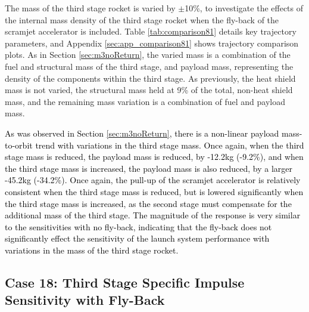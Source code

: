 \noindent
The mass of the third stage rocket is varied by $\pm$10\%, to investigate the effects of the internal mass density of the third stage rocket when the fly-back of the scramjet accelerator is included. Table \ref{tab:comparison81} details key trajectory parameters, and Appendix \ref{sec:app_comparison81} shows trajectory comparison plots. As in Section \ref{sec:m3noReturn}, the varied mass is a combination of the fuel and structural mass of the third stage, and payload mass, representing the density of the components within the third stage. As previously, the heat shield mass is not varied, the structural mass held at 9\% of the total, non-heat shield mass, and the remaining mass variation is a combination of fuel and payload mass.

\textcolor{black}{
As was observed in Section \ref{sec:m3noReturn}, there is a non-linear payload mass-to-orbit trend with variations in the third stage mass. Once again, when the third stage mass is reduced, the payload mass is reduced, by -12.2kg (-9.2\%), and when the third stage mass is increased, the payload mass is also reduced, by a larger -45.2kg (-34.2\%). Once again, the pull-up of the scramjet accelerator is relatively consistent when the third stage mass is reduced, but is lowered significantly when the third stage mass is increased, as the second stage must compensate for the additional mass of the third stage. The magnitude of the response is very similar to the sensitivities with no fly-back, indicating that the fly-back does not significantly effect the sensitivity of the launch system performance with variations in the mass of the third stage rocket. 
}


\subsection{Case 18: Third Stage Specific Impulse Sensitivity with Fly-Back}


